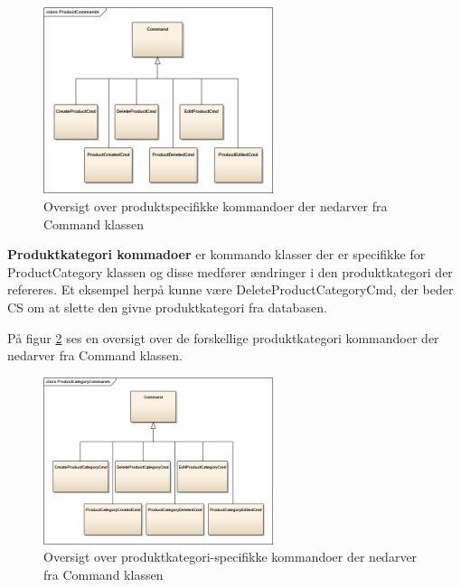 \begin{figure}[H]
    \centering
    \includegraphics[width=0.6\textwidth]{Systemdesign/SharedLib/Images/Commands/ProductCommands.png}
    \caption{Oversigt over produktspecifikke kommandoer der nedarver fra Command klassen}
    \label{fig:overklassePrd}
\end{figure}

\textbf{Produktkategori kommadoer} er kommando klasser der er specifikke for ProductCategory klassen og disse medfører ændringer i den produktkategori der refereres. Et eksempel herpå kunne være DeleteProductCategoryCmd, der beder \gls{CS} om at slette den givne produktkategori fra databasen.

På figur \ref{fig:overklassePrdCat} ses en oversigt over de forskellige produktkategori kommandoer der nedarver fra Command klassen.

\begin{figure}[H]
    \centering
    \includegraphics[width=0.6\textwidth]{Systemdesign/SharedLib/Images/Commands/ProductCategoryCommands.png}
    \caption{Oversigt over produktkategori-specifikke kommandoer der nedarver fra Command klassen}
    \label{fig:overklassePrdCat}
\end{figure}




